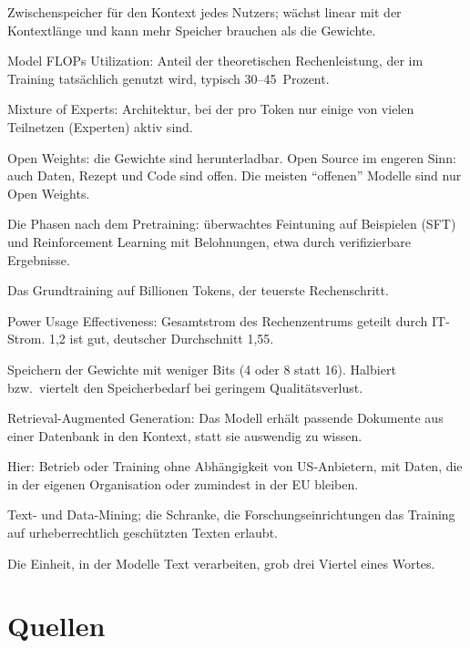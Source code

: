 \documentclass[a4paper,11pt]{article}
\begin{document}
\begin{description}[style=sameline, itemsep=0.15em]
\item[KV-Cache] Zwischenspeicher für den Kontext jedes Nutzers; wächst
  linear mit der Kontextlänge und kann mehr Speicher brauchen als die
  Gewichte.
\item[MFU] Model FLOPs Utilization: Anteil der theoretischen
  Rechenleistung, der im Training tatsächlich genutzt wird, typisch
  30--45~Prozent.
\item[MoE] Mixture of Experts: Architektur, bei der pro Token nur
  einige von vielen Teilnetzen (Experten) aktiv sind.
\item[Open Weights, Open Source] Open Weights: die Gewichte sind
  herunterladbar. Open Source im engeren Sinn: auch Daten, Rezept und
  Code sind offen. Die meisten \enquote{offenen} Modelle sind nur
  Open Weights.
\item[Post-Training, SFT, RL] Die Phasen nach dem Pretraining:
  überwachtes Feintuning auf Beispielen (SFT) und Reinforcement
  Learning mit Belohnungen, etwa durch verifizierbare Ergebnisse.
\item[Pretraining] Das Grundtraining auf Billionen Tokens, der
  teuerste Rechenschritt.
\item[PUE] Power Usage Effectiveness: Gesamtstrom des Rechenzentrums
  geteilt durch IT-Strom. 1,2 ist gut, deutscher Durchschnitt 1,55.
\item[Quantisierung] Speichern der Gewichte mit weniger Bits (4 oder
  8 statt 16). Halbiert bzw.\ viertelt den Speicherbedarf bei geringem
  Qualitätsverlust.
\item[RAG] Retrieval-Augmented Generation: Das Modell erhält passende
  Dokumente aus einer Datenbank in den Kontext, statt sie auswendig zu
  wissen.
\item[Souveränität] Hier: Betrieb oder Training ohne Abhängigkeit von
  US-Anbietern, mit Daten, die in der eigenen Organisation oder
  zumindest in der EU bleiben.
\item[TDM, \S\,60d UrhG] Text- und Data-Mining; die Schranke, die
  Forschungseinrichtungen das Training auf urheberrechtlich
  geschützten Texten erlaubt.
\item[Token] Die Einheit, in der Modelle Text verarbeiten, grob drei
  Viertel eines Wortes.
\end{description}

\section{Quellen}
\label{sec:quellen}
\end{document}
